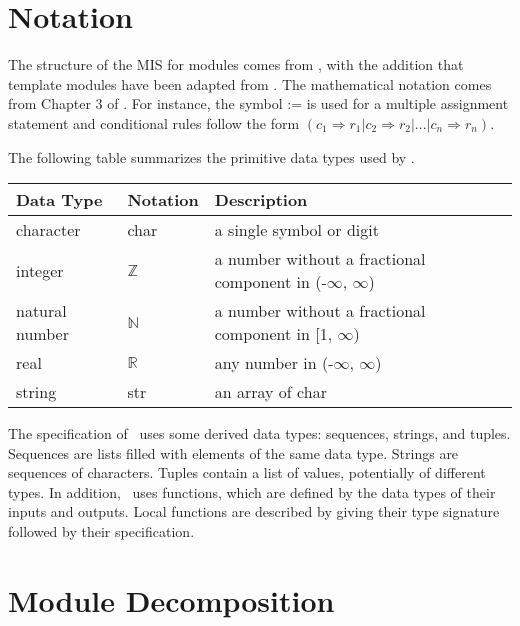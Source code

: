 \documentclass[12pt, titlepage]{article}
\begin{document}
\section{Notation}


The structure of the MIS for modules comes from \citet{HoffmanAndStrooper1995},
with the addition that template modules have been adapted from
\cite{GhezziEtAl2003}.  The mathematical notation comes from Chapter 3 of
\citet{HoffmanAndStrooper1995}.  For instance, the symbol := is used for a
multiple assignment statement and conditional rules follow the form $(c_1
\Rightarrow r_1 | c_2 \Rightarrow r_2 | ... | c_n \Rightarrow r_n )$.

The following table summarizes the primitive data types used by \progname. 

\begin{center}
\renewcommand{\arraystretch}{1.2}
\noindent 
\begin{tabular}{l l p{7.5cm}} 
\toprule 
\textbf{Data Type} & \textbf{Notation} & \textbf{Description}\\ 
\midrule
character & char & a single symbol or digit\\
integer & $\mathbb{Z}$ & a number without a fractional component in (-$\infty$, $\infty$) \\
natural number & $\mathbb{N}$ & a number without a fractional component in [1, $\infty$) \\
real & $\mathbb{R}$ & any number in (-$\infty$, $\infty$)\\
string & str & an array of char\\
\bottomrule
\end{tabular} 
\end{center}

\noindent
The specification of \progname \ uses some derived data types: sequences, strings, and
tuples. Sequences are lists filled with elements of the same data type. Strings
are sequences of characters. Tuples contain a list of values, potentially of
different types. In addition, \progname \ uses functions, which
are defined by the data types of their inputs and outputs. Local functions are
described by giving their type signature followed by their specification.

\section{Module Decomposition}
\end{document}
